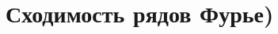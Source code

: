 \documentclass[../main.tex]{subfiles}
\begin{document}
 \chapter{Сходимость рядов Фурье)}
 \
\end{document}
